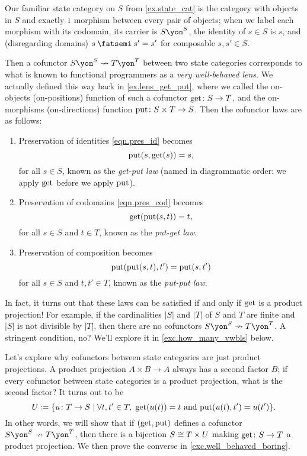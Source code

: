 \documentclass[Book-Poly]{subfiles}
\begin{document}
\begin{example} \label{ex.very_well_behaved_lenses}
Our familiar state category on $S$ from \cref{ex.state_cat} is the category with objects in $S$ and exactly $1$ morphism between every pair of objects; when we label each morphism with its codomain, its carrier is $S\yon^S$, the identity of $s\in S$ is $s$, and (disregarding domains) $s\then s'=s'$ for composable $s,s'\in S$.

Then a cofunctor $S\yon^S\cof T\yon^T$ between two state categories corresponds to what is known to functional programmers as a \emph{very well-behaved lens}.
We actually defined this way back in \cref{ex.lens_get_put}, where we called the on-objects (on-positions) function of such a cofunctor $\mathrm{get}\colon S\to T$, and the on-morphisms (on-directions) function $\mathrm{put}\colon S\times T\to S$.%
Then the cofunctor laws are as follows:
\begin{enumerate}
    \item Preservation of identities \eqref{eqn.pres_id} becomes
    \[
        \mathrm{put}(s,\mathrm{get}(s))=s,
    \]
    for all $s\in S$, known as the \emph{get-put law} (named in diagrammatic order: we apply $\mathrm{get}$ before we apply $\mathrm{put}$).

    \item Preservation of codomains \eqref{eqn.pres_cod} becomes
    \[
        \mathrm{get}(\mathrm{put}(s,t))=t,
    \]
    for all $s\in S$ and $t\in T$, known as the \emph{put-get law}.

    \item Preservation of composition becomes
    \[
        \mathrm{put}(\mathrm{put}(s,t),t')=\mathrm{put}(s,t')
    \]
    for all $s\in S$ and $t,t'\in T$, known as the \emph{put-put law}.
\end{enumerate}

In fact, it turns out that these laws can be satisfied if and only if $\mathrm{get}$ is a product projection!
For example, if the cardinalities $|S|$ and $|T|$ of $S$ and $T$ are finite and $|S|$ is not divisible by $|T|$, then there are no cofunctors $S\yon^S\cof T\yon^T$.
A stringent condition, no?
We'll explore it in  \cref{exc.how_many_vwbls} below.

Let's explore why cofunctors between state categories are just product projections.
A product projection $A\times B\to A$ always has a second factor $B$; if every cofunctor between state categories is a product projection, what is the second factor?
It turns out to be
\[
    U\coloneqq\{u\colon T\to S\mid \forall t,t'\in T,\;\mathrm{get}(u(t))=t\text{ and }\mathrm{put}(u(t),t')=u(t')\}.
\]
In other words, we will show that if $(\mathrm{get},\mathrm{put})$ defines a cofunctor $S\yon^S\cof T\yon^T$, then there is a bijection $S\cong T\times U$ making $\mathrm{get}\colon S\to T$ a product projection.
We then prove the converse in \cref{exc.well_behaved_boring}.


\end{example}
\end{document}
